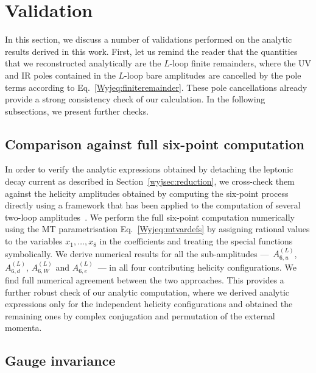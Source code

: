 \documentclass[main.tex]{subfiles}
\begin{document}
\section{Validation}
\label{wyjsec:validation}
In this section, we discuss a number of validations performed on the analytic results derived in this work.
First, let us remind the reader that the quantities that we reconstructed analytically are the $L$-loop finite remainders, where the UV and IR poles contained in the $L$-loop bare amplitudes are cancelled by the pole terms according to Eq.~\ref{Wyjeq:finiteremainder}. These pole cancellations already provide a strong consistency check of our calculation. In the following subsections, we present further checks.
\subsection{Comparison against full six-point computation}
In order to verify the analytic expressions obtained by detaching the leptonic decay current as described in Section~\ref{wyjsec:reduction}, 
we cross-check them against the helicity amplitudes obtained by computing the six-point process directly using a framework that has been applied to the computation of several 
two-loop amplitudes~\cite{Hartanto:2019uvl,Badger:2021owl,Badger:2021imn,Badger:2021ega}. We perform the full six-point computation numerically using the MT parametrisation Eq.~\ref{Wyjeq:mtvardefs} by assigning rational values to the variables $x_1, \ldots, x_8$ in the coefficients and treating the special functions symbolically. We derive numerical results for all the sub-amplitudes ---~$A^{(L)}_{6,u}$, $A^{(L)}_{6,d}$, $A^{(L)}_{6,W}$ and $A^{(L)}_{6,e}$~--- in all four contributing helicity configurations. We find full numerical agreement between the two approaches. 
This provides a further robust check of our analytic computation, where we derived analytic expressions only for the independent helicity configurations and obtained the remaining ones by complex conjugation and permutation of the external momenta.


\subsection{Gauge invariance}
\end{document}

